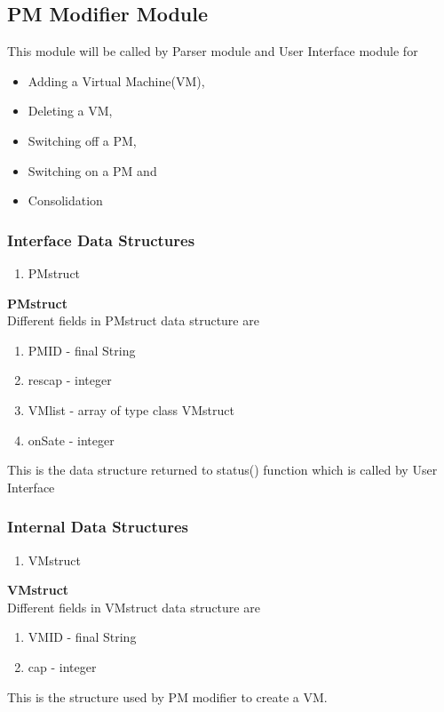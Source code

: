 ﻿\documentclass[a4paper,11pt]{article}
\begin{document}
\subsection{PM Modifier Module}
This module will be called by Parser module and User Interface module for
\begin{itemize}
 \item Adding a Virtual Machine(VM),
 \item Deleting a VM,
 \item Switching off a PM,
 \item Switching on a PM and
 \item Consolidation
\end{itemize}
\subsubsection{Interface Data Structures}
\begin{enumerate}
 \item PMstruct
 \end{enumerate}
\textbf{PMstruct}
\\

Different fields in PMstruct data structure are
\begin{enumerate}
 \item PM\textunderscore ID - final String
 \item res\textunderscore cap - integer
 \item VM\textunderscore list - array of type class VMstruct
 \item onSate - integer
\end{enumerate}

This is the data structure returned to status() function which is called by User Interface
\\
\subsubsection{Internal Data Structures}
\begin{enumerate}
 \item VMstruct
\end{enumerate}
\textbf{VMstruct}
\\

Different fields in VMstruct data structure are
\begin{enumerate}
 \item VM\textunderscore ID - final String
 \item cap - integer
\end{enumerate}
This is the structure used by PM modifier to create a VM.
\end{document}
